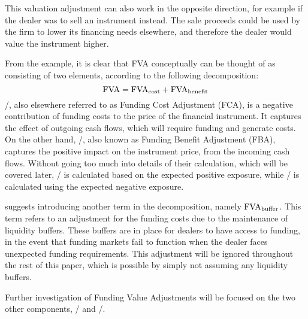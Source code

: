 \documentclass[main.tex]{subfiles}
\begin{document}
        This valuation adjustment can also work in the opposite direction, 
        for example if the dealer was to sell an instrument instead.
        The sale proceeds could be used by the firm to lower its financing needs elsewhere,
        and therefore the dealer would value the instrument higher. 

        From the example, it is clear that FVA conceptually can be thought of 
        as consisting of two elements, according to the following decomposition:
        \begin{equation}
            \FVA/ = \FCA/ + \FBA/
        \end{equation}
        \FCA/, also elsewhere referred to as Funding Cost Adjustment (FCA), 
        is a negative contribution of funding costs to the price of the financial instrument.
        It captures the effect of outgoing cash flows, which will require funding and generate costs.
        On the other hand, \FBA/, also known as Funding Benefit Adjustment (FBA), 
        captures the positive impact on the instrument price, from the incoming cash flows.
        Without going too much into details of their calculation, which will be covered later,
        \FCA/ is calculated based on the expected positive exposure, 
        while \FBA/ is calculated using the expected negative exposure. 

        \textcite{KPMGFVA} suggests introducing another term in the decomposition, namely
        $\FVA/_{\text{buffer}}$.
        This term refers to an adjustment for the funding costs
        due to the maintenance of liquidity buffers. 
        These buffers are in place for dealers to have access to funding, in the event
        that funding markets fail to function when the dealer faces unexpected funding requirements.
        This adjustment will be ignored throughout the rest of this paper, 
        which is possible by simply not assuming any liquidity buffers. 
        
        Further investigation of Funding Value Adjustments will be focused on the two other components,
        \FCA/ and \FBA/.
\end{document}

